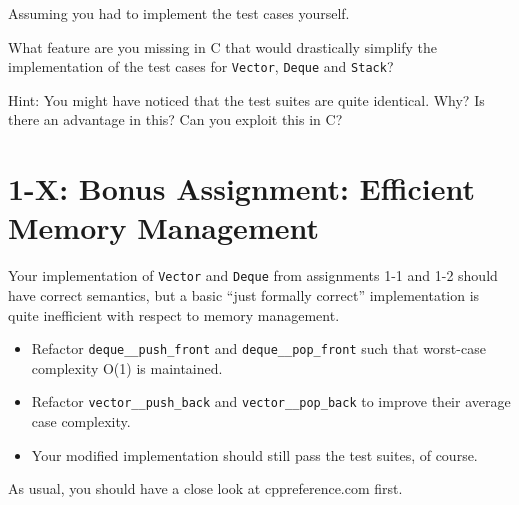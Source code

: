 \documentclass[]{article}
\providecommand{\tightlist}{%
  \setlength{\itemsep}{0pt}\setlength{\parskip}{0pt}}
\begin{document}
Assuming you had to implement the test cases yourself.

What feature are you missing in C that would drastically simplify the
implementation of the test cases for \texttt{Vector}, \texttt{Deque} and
\texttt{Stack}?

Hint: You might have noticed that the test suites are quite identical.
Why? Is there an advantage in this? Can you exploit this in C?

\section{1-X: Bonus Assignment: Efficient Memory
Management}\label{x-bonus-assignment-efficient-memory-management}

Your implementation of \texttt{Vector} and \texttt{Deque} from
assignments 1-1 and 1-2 should have correct semantics, but a basic
``just formally correct'' implementation is quite inefficient with
respect to memory management.

\begin{itemize}
\tightlist
\item
  Refactor \texttt{deque\_\_push\_front} and
  \texttt{deque\_\_pop\_front} such that worst-case complexity O(1) is
  maintained.
\item
  Refactor \texttt{vector\_\_push\_back} and
  \texttt{vector\_\_pop\_back} to improve their average case complexity.
\item
  Your modified implementation should still pass the test suites, of
  course.
\end{itemize}

As usual, you should have a close look at cppreference.com first.
\end{document}

